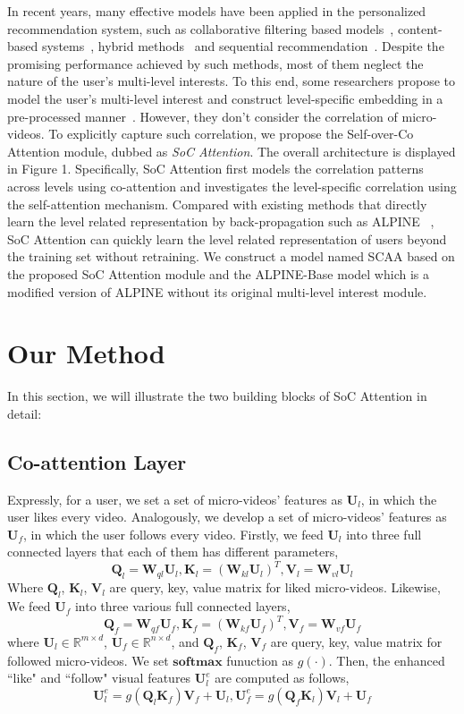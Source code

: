 \documentclass[letterpaper]{article} %
\begin{document}
	In recent years, many effective models have been applied in the personalized recommendation system, such as collaborative filtering based models~\cite{a}, content-based systems~\cite{content}, hybrid methods~\cite{item} and sequential recommendation~\cite{future}. Despite the promising performance achieved by such methods, most of them neglect the nature of the user's multi-level interests. To this end, some researchers propose to model the user's multi-level interest and construct level-specific embedding in a pre-processed manner~\cite{routing}. However, they don't consider the correlation of micro-videos. To explicitly capture such correlation, we propose the Self-over-Co Attention module, dubbed as \emph{SoC Attention}. The overall architecture is displayed in Figure 1. Specifically, SoC Attention first models the correlation patterns across levels using co-attention and investigates the level-specific correlation using the self-attention mechanism. Compared with existing methods that directly learn the level related representation by back-propagation such as ALPINE ~\cite{routing}, SoC Attention can quickly learn the level related representation of users beyond the training set without retraining. We construct a model named SCAA based on the proposed SoC Attention module and the ALPINE-Base model which is a modified version of ALPINE without its original multi-level interest module.          
	
	
	\section{Our Method}
	
	In this section, we will illustrate the two building blocks of SoC Attention in detail:	
	\subsection{Co-attention Layer}
	Expressly, for a user, we set a set of micro-videos' features as $\mathbf{U}_{l}$, in which the user likes every video. Analogously, we develop a set of micro-videos' features as $\mathbf{U}_{f}$, in which the user follows every video. Firstly, we feed $\mathbf{U}_{l}$ into three full connected layers that each of them has different parameters,
	$$
	\mathbf{Q}_{l}=\mathbf{W}_{ql}\mathbf{U}_{l},\mathbf{K}_{l}=\left(\mathbf{W}_{kl}\mathbf{U}_{l}\right)^{T},\mathbf{V}_{l}=\mathbf{W}_{vl}\mathbf{U}_{l}
	$$
	Where $\mathbf{Q}_{l}$, $\mathbf{K}_{l}$, $\mathbf{V}_{l}$ are query, key, value matrix for liked micro-videos. Likewise, We feed $\mathbf{U}_{f}$ into three various full connected layers,
	$$
	\mathbf{Q}_{f}=\mathbf{W}_{qf}\mathbf{U}_{f}, \mathbf{K}_{f}=\left(\mathbf{W}_{kf}\mathbf{U}_{f}\right)^{T}, \mathbf{V}_{f}=\mathbf{W}_{vf}\mathbf{U}_{f}
	$$
	where $\mathbf{U}_{l} \in \mathbb{R}^{m \times d}$, $\mathbf{U}_{f} \in \mathbb{R}^{n \times d}$, and $\mathbf{Q}_{f}$, $\mathbf{K}_{f}$, $\mathbf{V}_{f}$ are query, key, value matrix for followed micro-videos. We set $\mathbf{softmax}$ funuction as $g(\cdot)$. Then, the enhanced ``like" and ``follow" visual features $\mathbf{U}_{l}^{e}$ are computed as follows, 
	$$
	\mathbf{U}_{l}^{e}=g(\mathbf{Q}_{l}\mathbf{K}_{f})\mathbf{V}_{f}+\mathbf{U}_{l}, \mathbf{U}_{f}^{e}=g(\mathbf{Q}_{f}\mathbf{K}_{l})\mathbf{V}_{l}+\mathbf{U}_{f}
	$$    
\end{document}
